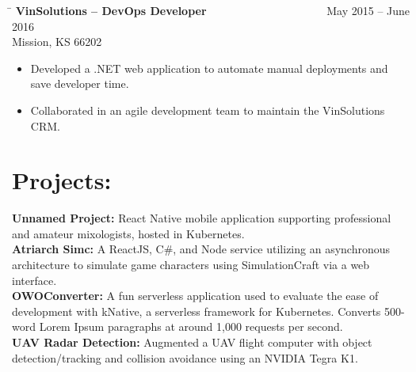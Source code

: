 \documentclass{res}
\begin{document}
\begin{resume}
\begin{changemargin}{-0.25in}{0in}
\begin{itemize}
	\end{itemize}
	\vspace{0.2in}
	\begin{tabbing}
		\hspace{5.5in}\= \kill 
		{\bf VinSolutions – DevOps Developer} \>~~~~~~~~~~~~~~~~~~~~~May 2015 – June 2016\\
		Mission, KS 66202
	\end{tabbing}\vspace{-1pt}
	\begin{itemize}
		\item Developed a .NET web application to automate manual deployments and save developer time.
		\item Collaborated in an agile development team to maintain the VinSolutions CRM.
		\vspace{-15pt}
	\end{itemize}
	\vspace{0.1in}
\end{changemargin}

\section{Projects:}       
{
	\begin{changemargin}{-0.25in}{0in}
		\textbf{Unnamed Project:} React Native mobile application supporting professional and amateur mixologists, hosted in Kubernetes.\\
		\textbf{Atriarch Simc:} A ReactJS, C\#, and Node service utilizing an asynchronous architecture to simulate game characters using SimulationCraft via a web interface.\\
		\textbf{OWOConverter:} A fun serverless application used to evaluate the ease of development with kNative, a serverless framework for Kubernetes. Converts 500-word Lorem Ipsum paragraphs at around 1,000 requests per second.\\
		\textbf{UAV Radar Detection:} Augmented a UAV flight computer with object detection/tracking and collision avoidance using an NVIDIA Tegra K1.
	\end{changemargin}
}

\end{resume}
\end{document}
